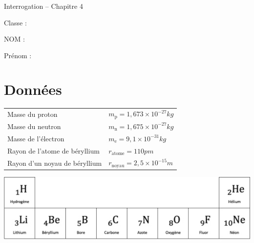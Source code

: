 \documentclass[12pt,a4paper]{article}
\begin{document}
\begin{header}
Interrogation -- Chapitre 4

\normalsize
\flushleft
\begin{doublespace}
Classe :

NOM :

\end{doublespace}
Prénom : 
\end{header}

\section*{Données}

\begin{center}
\begin{tabular}{ll}
Masse du proton 		& $m_\mathrm{p} = \unit{1{,}673 \times 10^{-27}}{kg}$ \\
Masse du neutron	& $m_\mathrm{n} = \unit{1{,}675 \times 10^{-27}}{kg}$ \\
Masse de l'électron	& $m_\mathrm{e} = \unit{9{,}1 \times 10^{-31}}{kg}$ \\
Rayon de l'atome de béryllium & $r_\mathrm{atome} = \unit{110}{pm} $ \\
Rayon d'un noyau de béryllium & $r_\mathrm{noyau} = \unit{2{,}5\times 10^{-15}}{m} $
\end{tabular}

\includegraphics[scale=0.5]{images/periodic_table_2.png}
\end{center}
\end{document}
